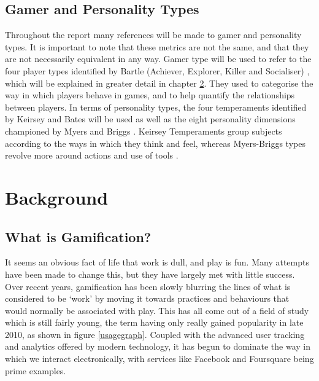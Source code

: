 \documentclass[12pt,a4paper,twoside]{report}
\begin{document}
\section{Gamer and Personality Types}
Throughout the report many references will be made to gamer and personality types. It is important to note that these metrics are not the same, and that they are not necessarily equivalent in any way. Gamer type will be used to refer to the four player types identified by Bartle (Achiever, Explorer, Killer and Socialiser) \cite{bartle1996hearts}, which will be explained in greater detail in chapter \ref{sec:background}. They used to categorise the way in which players behave in games, and to help quantify the relationships between players. In terms of personality types, the four temperaments identified by Keirsey and Bates \cite{keirsey1998please} \cite{keirsey1984} will be used as well as the eight personality dimensions championed by Myers and Briggs \cite{myers1995gifts}. Keirsey Temperaments group subjects according to the ways in which they think and feel, whereas Myers-Briggs types revolve more around actions and use of tools \cite{keirsey1984}.

\chapter{Background}
\label{sec:background}
\section{What is Gamification?}
It seems an obvious fact of life that work is dull, and play is fun. Many attempts have been made to change this, but they have largely met with little success. Over recent years, gamification has been slowly blurring the lines of what is considered to be `work' by moving it towards practices and behaviours that would normally be associated with play. This has all come out of a field of study which is still fairly young, the term having only really gained popularity in late 2010, as shown in figure \ref{usagegraph}. Coupled with the advanced user tracking and analytics offered by modern technology, it has begun to dominate the way in which we interact electronically, with services like Facebook and Foursquare being prime examples.
\end{document}
